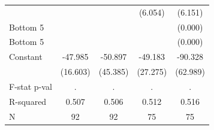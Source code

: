 \begin{tabular}{l*{4}{c}}
                    &            &            &     (6.054)&     (6.151)\\
\addlinespace
Bottom 5%
                    &            &            &            &     (0.000)\\
\addlinespace
Bottom 5%
                    &            &            &            &     (0.000)\\
\addlinespace
Constant            &     -47.985&     -50.897&     -49.183&     -90.328\\
                    &    (16.603)&    (45.385)&    (27.275)&    (62.989)\\
\midrule
F-stat p-val        &           .&           .&           .&           .\\
R-squared           &       0.507&       0.506&       0.512&       0.516\\
N                   &          92&          92&          75&          75\\
\bottomrule
\end{tabular}
